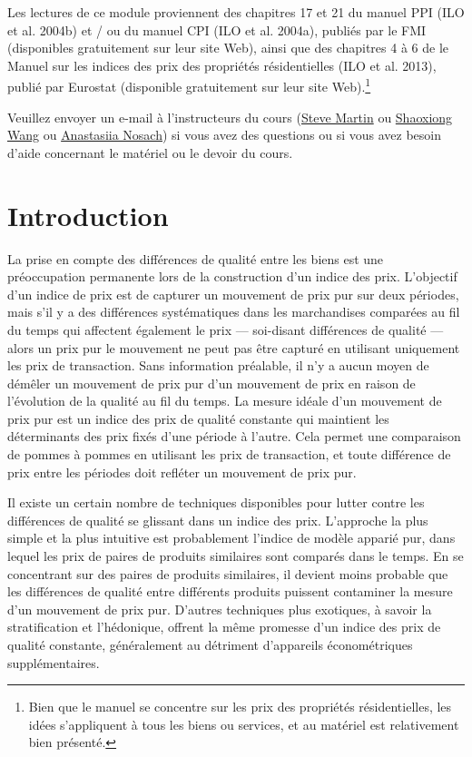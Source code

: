 \documentclass[
]{article}
\begin{document}
Les lectures de ce module proviennent des chapitres 17 et 21 du manuel PPI (ILO et al. 2004b) et / ou du manuel CPI (ILO et al. 2004a), publiés par le FMI (disponibles gratuitement sur leur site Web), ainsi que des chapitres 4 à 6 de le Manuel sur les indices des prix des propriétés résidentielles (ILO et al. 2013), publié par Eurostat (disponible gratuitement sur leur site Web).\footnote{Bien que le manuel se concentre sur les prix des propriétés résidentielles, les idées s'appliquent à tous les biens ou services, et au matériel est relativement bien présenté.}

Veuillez envoyer un e-mail à l'instructeurs du cours (\href{mailto:steve.martin5@canada.ca}{Steve Martin} ou \href{mailto:shaoxiong.wang@canada.ca}{Shaoxiong Wang} ou \href{mailto:anastasiia.nosach@canada.ca}{Anastasiia Nosach}) si vous avez des questions ou si vous avez besoin d'aide concernant le matériel ou le devoir du cours.

\hypertarget{introduction}{%
\section{Introduction}\label{introduction}}

La prise en compte des différences de qualité entre les biens est une préoccupation permanente lors de la construction d'un indice des prix. L'objectif d'un indice de prix est de capturer un mouvement de prix pur sur deux périodes, mais s'il y a des différences systématiques dans les marchandises comparées au fil du temps qui affectent également le prix --- soi-disant différences de qualité --- alors un prix pur le mouvement ne peut pas être capturé en utilisant uniquement les prix de transaction. Sans information préalable, il n'y a aucun moyen de démêler un mouvement de prix pur d'un mouvement de prix en raison de l'évolution de la qualité au fil du temps. La mesure idéale d'un mouvement de prix pur est un indice des prix de qualité constante qui maintient les déterminants des prix fixés d'une période à l'autre. Cela permet une comparaison de pommes à pommes en utilisant les prix de transaction, et toute différence de prix entre les périodes doit refléter un mouvement de prix pur.

Il existe un certain nombre de techniques disponibles pour lutter contre les différences de qualité se glissant dans un indice des prix. L'approche la plus simple et la plus intuitive est probablement l'indice de modèle apparié pur, dans lequel les prix de paires de produits similaires sont comparés dans le temps. En se concentrant sur des paires de produits similaires, il devient moins probable que les différences de qualité entre différents produits puissent contaminer la mesure d'un mouvement de prix pur. D'autres techniques plus exotiques, à savoir la stratification et l'hédonique, offrent la même promesse d'un indice des prix de qualité constante, généralement au détriment d'appareils économétriques supplémentaires.
\end{document}
